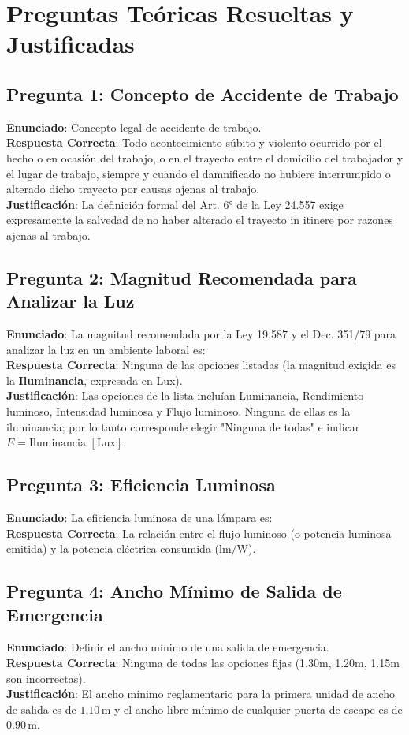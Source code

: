 \documentclass[]{informeutn}
\begin{document}
\section{Preguntas Teóricas Resueltas y Justificadas}

\subsection{Pregunta 1: Concepto de Accidente de Trabajo}
\textbf{Enunciado}: Concepto legal de accidente de trabajo. \\
\textbf{Respuesta Correcta}: Todo acontecimiento súbito y violento ocurrido por el hecho o en ocasión del trabajo, o en el trayecto entre el domicilio del trabajador y el lugar de trabajo, siempre y cuando el damnificado no hubiere interrumpido o alterado dicho trayecto por causas ajenas al trabajo. \\
\textbf{Justificación}: La definición formal del Art. 6° de la Ley 24.557 exige expresamente la salvedad de no haber alterado el trayecto in itinere por razones ajenas al trabajo.

\subsection{Pregunta 2: Magnitud Recomendada para Analizar la Luz}
\textbf{Enunciado}: La magnitud recomendada por la Ley 19.587 y el Dec. 351/79 para analizar la luz en un ambiente laboral es: \\
\textbf{Respuesta Correcta}: Ninguna de las opciones listadas (la magnitud exigida es la \textbf{Iluminancia}, expresada en Lux). \\
\textbf{Justificación}: Las opciones de la lista incluían Luminancia, Rendimiento luminoso, Intensidad luminosa y Flujo luminoso. Ninguna de ellas es la iluminancia; por lo tanto corresponde elegir "Ninguna de todas" e indicar $E = \text{Iluminancia } [\text{Lux}]$.

\subsection{Pregunta 3: Eficiencia Luminosa}
\textbf{Enunciado}: La eficiencia luminosa de una lámpara es: \\
\textbf{Respuesta Correcta}: La relación entre el flujo luminoso (o potencia luminosa emitida) y la potencia eléctrica consumida ($\text{lm/W}$).

\subsection{Pregunta 4: Ancho Mínimo de Salida de Emergencia}
\textbf{Enunciado}: Definir el ancho mínimo de una salida de emergencia. \\
\textbf{Respuesta Correcta}: Ninguna de todas las opciones fijas (1.30m, 1.20m, 1.15m son incorrectas). \\
\textbf{Justificación}: El ancho mínimo reglamentario para la primera unidad de ancho de salida es de \textbf{$1.10\,\text{m}$} y el ancho libre mínimo de cualquier puerta de escape es de $0.90\,\text{m}$.
\end{document}
